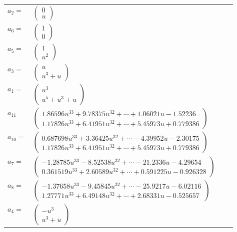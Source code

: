 \documentclass[1p]{elsarticle_modified}
\theoremstyle{definition}
\begin{document}
\begin{tabular}{m{7pt} m{180pt} m{7pt} m{180pt} }
\flushright $a_{2}=$&$\begin{pmatrix}0\\u\end{pmatrix}$ \\
\flushright $a_{6}=$&$\begin{pmatrix}1\\0\end{pmatrix}$ \\
\flushright $a_{5}=$&$\begin{pmatrix}1\\u^2\end{pmatrix}$ \\
\flushright $a_{3}=$&$\begin{pmatrix}u\\u^3+u\end{pmatrix}$ \\
\flushright $a_{1}=$&$\begin{pmatrix}u^3\\u^5+u^3+u\end{pmatrix}$ \\
\flushright $a_{11}=$&$\begin{pmatrix}1.86596 u^{33}+9.78375 u^{32}+\cdots+1.06021 u-1.52236\\1.17826 u^{33}+6.41951 u^{32}+\cdots+5.45973 u+0.779386\end{pmatrix}$ \\
\flushright $a_{10}=$&$\begin{pmatrix}0.687698 u^{33}+3.36425 u^{32}+\cdots-4.39952 u-2.30175\\1.17826 u^{33}+6.41951 u^{32}+\cdots+5.45973 u+0.779386\end{pmatrix}$ \\
\flushright $a_{7}=$&$\begin{pmatrix}-1.28785 u^{33}-8.52538 u^{32}+\cdots-21.2336 u-4.29654\\0.361519 u^{33}+2.60589 u^{32}+\cdots+0.591225 u-0.926328\end{pmatrix}$ \\
\flushright $a_{8}=$&$\begin{pmatrix}-1.37658 u^{33}-9.45845 u^{32}+\cdots-25.9217 u-6.02116\\1.27771 u^{33}+6.49148 u^{32}+\cdots+2.68331 u-0.525657\end{pmatrix}$ \\
\flushright $a_{4}=$&$\begin{pmatrix}- u^3\\u^3+u\end{pmatrix}$ \\

\end{tabular}
\end{document}
